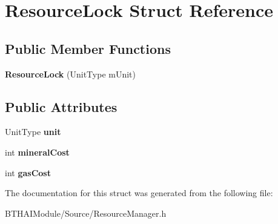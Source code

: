 \hypertarget{struct_resource_lock}{\section{Resource\-Lock Struct Reference}
\label{struct_resource_lock}
}
\subsection*{Public Member Functions}
\begin{DoxyCompactItemize}
\item 
\hypertarget{struct_resource_lock_a9d5bc89c9fa2a4e417ab2b8df2a0d676}{{\bfseries Resource\-Lock} (Unit\-Type m\-Unit)}\label{struct_resource_lock_a9d5bc89c9fa2a4e417ab2b8df2a0d676}

\end{DoxyCompactItemize}
\subsection*{Public Attributes}
\begin{DoxyCompactItemize}
\item 
\hypertarget{struct_resource_lock_a3ad7eb8d4d8944109c2f7014900274f0}{Unit\-Type {\bfseries unit}}\label{struct_resource_lock_a3ad7eb8d4d8944109c2f7014900274f0}

\item 
\hypertarget{struct_resource_lock_a4a339736de8bbc8b857fa4fea97e18e6}{int {\bfseries mineral\-Cost}}\label{struct_resource_lock_a4a339736de8bbc8b857fa4fea97e18e6}

\item 
\hypertarget{struct_resource_lock_a2235cea759f609af8bb7ac8fc490333d}{int {\bfseries gas\-Cost}}\label{struct_resource_lock_a2235cea759f609af8bb7ac8fc490333d}

\end{DoxyCompactItemize}


The documentation for this struct was generated from the following file\-:\begin{DoxyCompactItemize}
\item 
B\-T\-H\-A\-I\-Module/\-Source/Resource\-Manager.\-h\end{DoxyCompactItemize}
